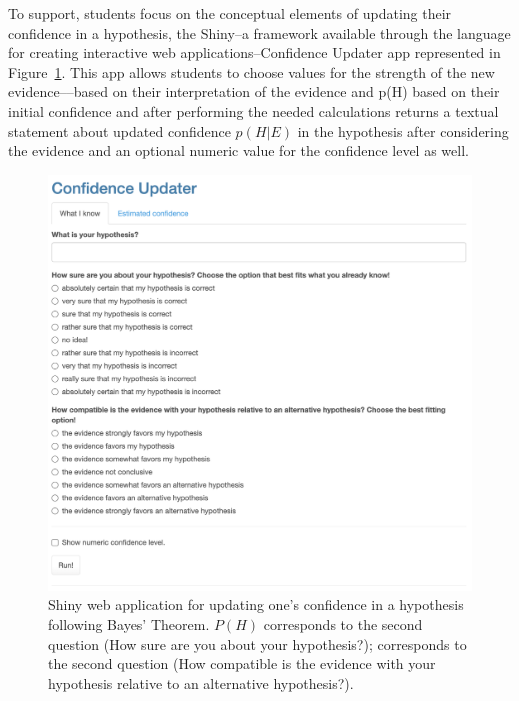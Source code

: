 \documentclass[man, floatsintext]{apa7} %
\begin{document}
To support, students focus on the conceptual elements of updating their confidence in a hypothesis, the Shiny--a framework available through the  language \parencite{rlang} for creating interactive web applications--Confidence Updater app represented in Figure~\ref{fig:confidence-updater-input}. This app allows students to choose values for the strength of the new evidence----based on their interpretation of the evidence and p(H) based on their initial confidence and after performing the needed calculations returns a textual statement about updated confidence $p(H|E)$ in the hypothesis after considering the evidence and an optional numeric value for the confidence level as well. \\

\begin{figure}[h]
\begin{center}
\includegraphics[width = .785\paperwidth]{confidence-updater-input.png}
\caption{Shiny web application for updating one’s confidence in a hypothesis following Bayes' Theorem. $P(H)$ corresponds to the second question (How sure are you about your hypothesis?);  corresponds to the second question (How compatible is the evidence with your hypothesis relative to an alternative hypothesis?).}
\label{fig:confidence-updater-input}
\end{center}
\end{figure}
\end{document}
